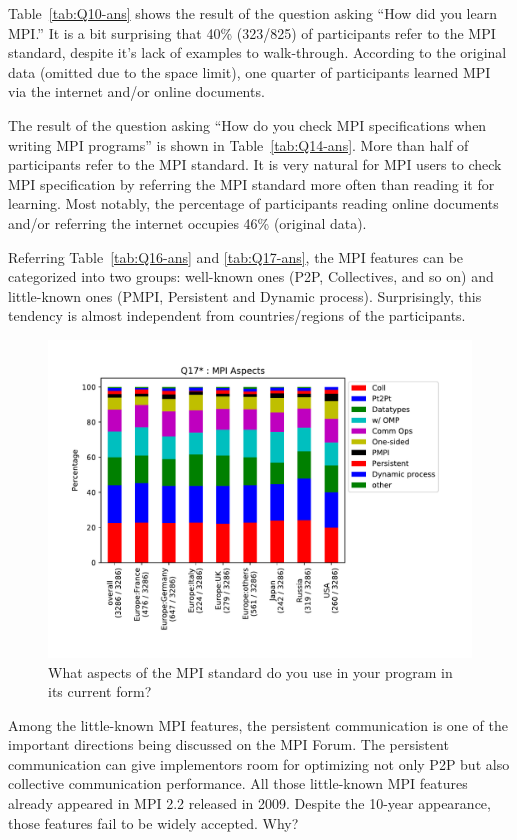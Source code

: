 \documentclass[sigconf,nonacm]{acmart}
\begin{document}
Table~\ref{tab:Q10-ans} shows the result of the question asking ``How
did you learn MPI.'' It is a bit surprising that 40\% (323/825) of
participants refer to the MPI standard, despite it's lack of examples
to walk-through. According to the original
data (omitted due to the space limit), one quarter of participants
learned MPI via the internet and/or online documents.

The result of the question asking ``How do you check MPI
specifications when writing MPI programs'' is shown in
Table~\ref{tab:Q14-ans}. More than half of participants refer to the
MPI standard. It is very natural for MPI users to check MPI
specification by referring the MPI standard more often than reading it
for learning. Most notably, the percentage of participants reading
online documents and/or referring the internet occupies 46\% (original
data).

Referring Table~\ref{tab:Q16-ans} and \ref{tab:Q17-ans}, the MPI
features can be categorized into two groups: well-known ones (P2P,
Collectives, and so on) and little-known ones (PMPI, Persistent and
Dynamic process). Surprisingly, this tendency is almost independent
from countries/regions of the participants.

\begin{figure}[bht]
\begin{center}
\includegraphics[width=0.8\hsize]{figs/Q17-S.pdf}
\caption{What aspects of the MPI standard do you use in your program in its current form?}%
\label{fig:Q17}
\end{center}
\end{figure}

Among the little-known MPI features, the persistent communication is
one of the important directions being discussed on the MPI Forum\cite{mpi-forum}.
The persistent communication can give implementors room for
optimizing not only P2P but also collective communication
performance.
All those little-known MPI features already appeared in MPI 2.2
released in 2009. Despite the 10-year appearance, those features
fail to be widely accepted.  Why?
\end{document}
